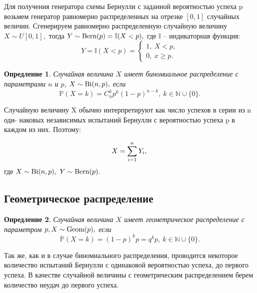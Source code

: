 \documentclass[11pt]{article}
\newtheorem{definition}{Опредление}
\newcommand{\bern}{\normalfont{\text{Bern}}}
\newcommand{\bi}{\normalfont{\text{Bi}}}
\newcommand{\geom}{\normalfont{\text{Geom}}}
\numberwithin{equation}{section}
\begin{document}
Для получения генератора схемы Бернулли с заданной вероятностью успеха p возьмем генератор равномерно распределенных на отрезке $[0, 1]$ случайных величин.
Сгенерируем равномерно распределенную случайную величину $X \sim U[0,1],$ тогда $Y \sim \bern (p) = \mathbb{I}(X < p), $ где $\mathbb{I}$ -- индикаторная функция:
\begin{equation}
  Y = \mathbb{I}(X<p) =
  \begin{cases}
    1,\ X<p,\\
    0,\ x \geq p.
  \end{cases}
\end{equation}
\begin{definition}
Случайная величина $X$ имеет биномиальное распределение с параметрами $n$ и $p$, $X \sim \bi(n,p),$ если 
\begin{equation}
  \mathbb{P}(X=k) = C^k_n p^k (1-p)^{n-k}, \ k \in \mathbb{N} \cup \{0 \}.
\end{equation} 
\end{definition}
Случайную величину X обычно интерпретируют как число успехов в серии из n оди- наковых независимых испытаний Бернулли с вероятностью успеха p в каждом из них.
Поэтому:

$$X = \sum_{i=1}^{n} Y_i,\\$$
где $X \sim \bi(n,p), \ Y \sim \bern(p).$
\subsection{Геометрическое распределение}
\begin{definition}
Случайная величина $X$ имеет геометрическое распределение с параметром $p, X \sim \geom(p),$ если
$$ \mathbb{P}(X=k) = (1-p)^k p = q^k p, \ k\in \mathbb{N} \cup \{0\}.$$
\end{definition}
Так же, как и в случае биномиального распределения, проводится некоторое количество испытаний Бернулли с одинаковой вероятностью успеха, до первого успеха. В качестве случайной величины с геометрическим распределением берем количество неудач до первого успеха.
\end{document}
